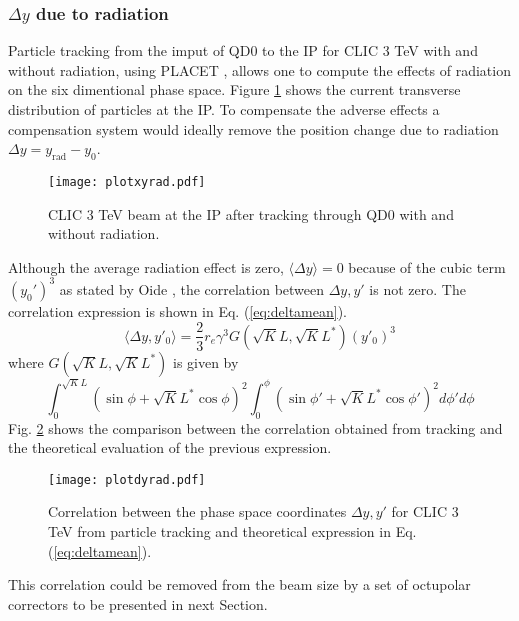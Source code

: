 \subsubsection{$\Delta y$ due to radiation}
Particle tracking from the imput of QD0 to the IP for CLIC 3 TeV with and without radiation, using PLACET \cite{Placet}, allows one to compute the effects of radiation on the six dimentional phase space. Figure \ref{f:CLIC3TeVbeamsizeIP} shows the current transverse distribution of particles at the IP. To compensate the adverse effects a compensation system would ideally remove the position change due to radiation $\Delta y = y_\text{rad} -y_0$.\par
\begin{figure}[!htb]
\centering
 \texttt{[image: plotxyrad.pdf]}\caption{CLIC 3 TeV beam at the IP after tracking through 	QD0 with and without radiation.}\label{f:CLIC3TeVbeamsizeIP}
\end{figure}
Although the average radiation effect is zero, $\langle \Delta y \rangle = 0$ because of the cubic term $(y_0')^3$ as stated by Oide \cite{Oide}, the correlation between $\Delta y, y'$ is not zero. The correlation expression is shown in Eq. (\ref{eq:deltamean}).
\begin{equation}
 \langle\Delta y,y'_0\rangle = \frac{2}{3}r_e\gamma^3G(\sqrt{K}L,\sqrt{K}L^*)(y'_0)^3\label{eq:deltamean}
\end{equation}
where $G(\sqrt{K}L,\sqrt{K}L^*)$ is given by
\begin{equation}
\int_0^{\sqrt{K}L}(\sin\phi+\sqrt{K}L^*\cos\phi)^2\int_0^\phi (\sin\phi'+\sqrt{K}L^*\cos\phi')^2 d\phi'd\phi
\end{equation}
Fig. \ref{f:correlation} shows the comparison between the correlation obtained from tracking and the theoretical evaluation of the previous expression.\par
\begin{figure}[!htb]
\centering
\texttt{[image: plotdyrad.pdf]}\caption{Correlation between the phase space coordinates $\Delta y,y'$ for CLIC 3 TeV from particle tracking and theoretical expression in Eq. (\ref{eq:deltamean}).}\label{f:correlation}
\end{figure}
This correlation could be removed from the beam size by a set of octupolar correctors to be presented in next Section.
